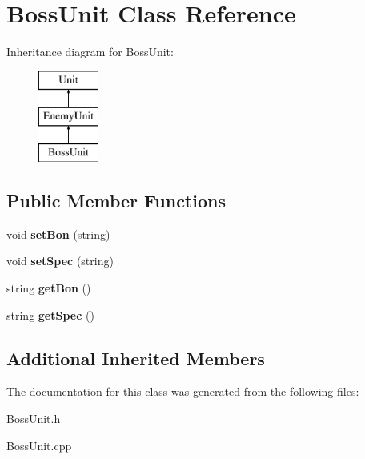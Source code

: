 \hypertarget{class_boss_unit}{}\section{Boss\+Unit Class Reference}
\label{class_boss_unit}
Inheritance diagram for Boss\+Unit\+:\begin{figure}[H]
\begin{center}
\leavevmode
\includegraphics[height=3.000000cm]{class_boss_unit}
\end{center}
\end{figure}
\subsection*{Public Member Functions}
\begin{DoxyCompactItemize}
\item 
\hypertarget{class_boss_unit_a2d4dc82113ddce7c27cd3ea6eeb6cc17}{}void {\bfseries set\+Bon} (string)\label{class_boss_unit_a2d4dc82113ddce7c27cd3ea6eeb6cc17}

\item 
\hypertarget{class_boss_unit_add584e941cb3823fdc0d82c706bf9ed5}{}void {\bfseries set\+Spec} (string)\label{class_boss_unit_add584e941cb3823fdc0d82c706bf9ed5}

\item 
\hypertarget{class_boss_unit_a0eecd42028e0d4ff0334c2807875c8e9}{}string {\bfseries get\+Bon} ()\label{class_boss_unit_a0eecd42028e0d4ff0334c2807875c8e9}

\item 
\hypertarget{class_boss_unit_af3cdfcec977cb32bb5704b0388daeca9}{}string {\bfseries get\+Spec} ()\label{class_boss_unit_af3cdfcec977cb32bb5704b0388daeca9}

\end{DoxyCompactItemize}
\subsection*{Additional Inherited Members}


The documentation for this class was generated from the following files\+:\begin{DoxyCompactItemize}
\item 
Boss\+Unit.\+h\item 
Boss\+Unit.\+cpp\end{DoxyCompactItemize}
